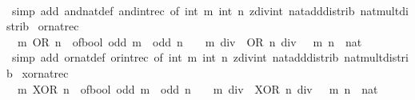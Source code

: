 \begin{isabellebody}
%
\isadelimproof
\ \ %
\endisadelimproof
%
\isatagproof
{}\isamarkupfalse%
\ {\isacharparenleft}{\kern0pt}simp\ add{\isacharcolon}{\kern0pt}\ and{\isacharunderscore}{\kern0pt}nat{\isacharunderscore}{\kern0pt}def\ and{\isacharunderscore}{\kern0pt}int{\isacharunderscore}{\kern0pt}rec\ {\isacharbrackleft}{\kern0pt}of\ {\isacartoucheopen}int\ m{\isacartoucheclose}\ {\isacartoucheopen}int\ n{\isacartoucheclose}{\isacharbrackright}{\kern0pt}\ zdiv{\isacharunderscore}{\kern0pt}int\ nat{\isacharunderscore}{\kern0pt}add{\isacharunderscore}{\kern0pt}distrib\ nat{\isacharunderscore}{\kern0pt}mult{\isacharunderscore}{\kern0pt}distrib{\isacharparenright}{\kern0pt}%
\endisatagproof
{\isafoldproof}%
%
\isadelimproof
\isanewline
%
\endisadelimproof
\isanewline
{}\isamarkupfalse%
\ or{\isacharunderscore}{\kern0pt}nat{\isacharunderscore}{\kern0pt}rec{\isacharcolon}{\kern0pt}\isanewline
\ \ {\isacartoucheopen}m\ OR\ n\ {\isacharequal}{\kern0pt}\ of{\isacharunderscore}{\kern0pt}bool\ {\isacharparenleft}{\kern0pt}odd\ m\ {\isasymor}\ odd\ n{\isacharparenright}{\kern0pt}\ {\isacharplus}{\kern0pt}\ {}\ {\isacharasterisk}{\kern0pt}\ {\isacharparenleft}{\kern0pt}{\isacharparenleft}{\kern0pt}m\ div\ {}{\isacharparenright}{\kern0pt}\ OR\ {\isacharparenleft}{\kern0pt}n\ div\ {}{\isacharparenright}{\kern0pt}{\isacharparenright}{\kern0pt}{\isacartoucheclose}\ \ m\ n\ {\isacharcolon}{\kern0pt}{\isacharcolon}{\kern0pt}\ nat\isanewline
%
\isadelimproof
\ \ %
\endisadelimproof
%
\isatagproof
{}\isamarkupfalse%
\ {\isacharparenleft}{\kern0pt}simp\ add{\isacharcolon}{\kern0pt}\ or{\isacharunderscore}{\kern0pt}nat{\isacharunderscore}{\kern0pt}def\ or{\isacharunderscore}{\kern0pt}int{\isacharunderscore}{\kern0pt}rec\ {\isacharbrackleft}{\kern0pt}of\ {\isacartoucheopen}int\ m{\isacartoucheclose}\ {\isacartoucheopen}int\ n{\isacartoucheclose}{\isacharbrackright}{\kern0pt}\ zdiv{\isacharunderscore}{\kern0pt}int\ nat{\isacharunderscore}{\kern0pt}add{\isacharunderscore}{\kern0pt}distrib\ nat{\isacharunderscore}{\kern0pt}mult{\isacharunderscore}{\kern0pt}distrib{\isacharparenright}{\kern0pt}%
\endisatagproof
{\isafoldproof}%
%
\isadelimproof
\isanewline
%
\endisadelimproof
\isanewline
{}\isamarkupfalse%
\ xor{\isacharunderscore}{\kern0pt}nat{\isacharunderscore}{\kern0pt}rec{\isacharcolon}{\kern0pt}\isanewline
\ \ {\isacartoucheopen}m\ XOR\ n\ {\isacharequal}{\kern0pt}\ of{\isacharunderscore}{\kern0pt}bool\ {\isacharparenleft}{\kern0pt}odd\ m\ {\isasymnoteq}\ odd\ n{\isacharparenright}{\kern0pt}\ {\isacharplus}{\kern0pt}\ {}\ {\isacharasterisk}{\kern0pt}\ {\isacharparenleft}{\kern0pt}{\isacharparenleft}{\kern0pt}m\ div\ {}{\isacharparenright}{\kern0pt}\ XOR\ {\isacharparenleft}{\kern0pt}n\ div\ {}{\isacharparenright}{\kern0pt}{\isacharparenright}{\kern0pt}{\isacartoucheclose}\ \ m\ n\ {\isacharcolon}{\kern0pt}{\isacharcolon}{\kern0pt}\ nat\isanewline

\end{isabellebody}
